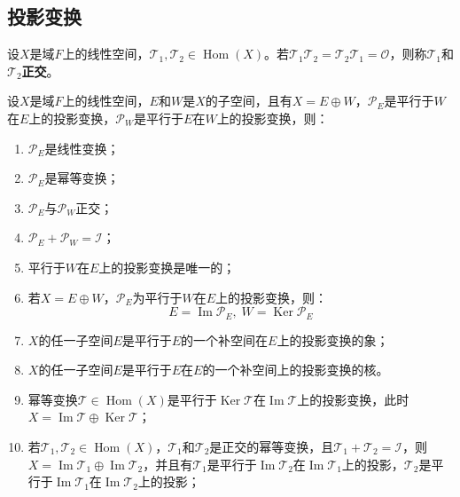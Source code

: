 \subsection{投影变换}
\begin{definition}
	设$X$是域$F$上的线性空间，$\mathcal{T}_1,\mathcal{T}_2\in\operatorname{Hom}(X)$。若$\mathcal{T}_1\mathcal{T}_2=\mathcal{T}_2\mathcal{T}_1=\mathcal{O}$，则称$\mathcal{T}_1$和$\mathcal{T}_2$\textbf{正交}。
\end{definition}
\begin{property}\label{prop:ProjectionTransformation}
	设$X$是域$F$上的线性空间，$E$和$W$是$X$的子空间，且有$X=E\oplus W$，$\mathcal{P}_E$是平行于$W$在$E$上的投影变换，$\mathcal{P}_W$是平行于$E$在$W$上的投影变换，则：
	\begin{enumerate}
		\item $\mathcal{P}_E$是线性变换；
		\item $\mathcal{P}_E$是幂等变换；
		\item $\mathcal{P}_E$与$\mathcal{P}_W$正交；
		\item $\mathcal{P}_E+\mathcal{P}_W=\mathcal{I}$；
		\item 平行于$W$在$E$上的投影变换是唯一的；
		\item 若$X=E\oplus W$，$\mathcal{P}_E$为平行于$W$在$E$上的投影变换，则：
		\begin{equation*}
			E=\operatorname{Im}\mathcal{P}_E,\;W=\operatorname{Ker}\mathcal{P}_E
		\end{equation*}
		\item $X$的任一子空间$E$是平行于$E$的一个补空间在$E$上的投影变换的象；
		\item $X$的任一子空间$E$是平行于$E$在$E$的一个补空间上的投影变换的核。
		\item 幂等变换$\mathcal{T}\in\operatorname{Hom}(X)$是平行于$\operatorname{Ker}\mathcal{T}$在$\operatorname{Im}\mathcal{T}$上的投影变换，此时$X=\operatorname{Im}\mathcal{T}\oplus\operatorname{Ker}\mathcal{T}$；
		\item 若$\mathcal{T}_1,\mathcal{T}_2\in\operatorname{Hom}(X)$，$\mathcal{T}_1$和$\mathcal{T}_2$是正交的幂等变换，且$\mathcal{T}_1+\mathcal{T}_2=\mathcal{I}$，则$X=\operatorname{Im}\mathcal{T}_1\oplus\operatorname{Im}\mathcal{T}_2$，并且有$\mathcal{T}_1$是平行于$\operatorname{Im}\mathcal{T}_2$在$\operatorname{Im}\mathcal{T}_1$上的投影，$\mathcal{T}_2$是平行于$\operatorname{Im}\mathcal{T}_1$在$\operatorname{Im}\mathcal{T}_2$上的投影；
	\end{enumerate}
\end{property}
